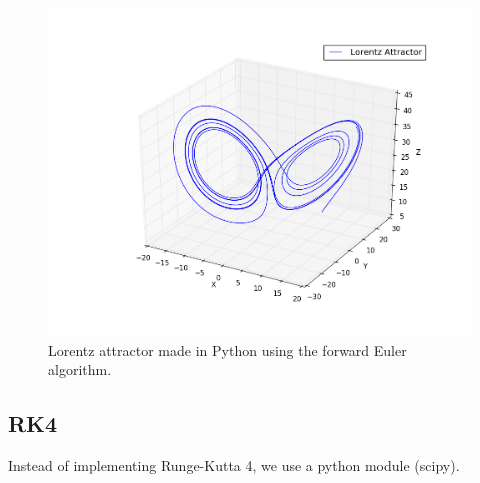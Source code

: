 \documentclass[a4paper,10pt]{article}
\begin{document}
\begin{figure}
 \centering
 \includegraphics[width = \linewidth]{euler}
 \caption{Lorentz attractor made in Python using the forward Euler algorithm.}
 \label{1}
\end{figure}

\clearpage

\subsection*{RK4}
Instead of implementing Runge-Kutta 4, we use a python module (scipy).
\end{document}
